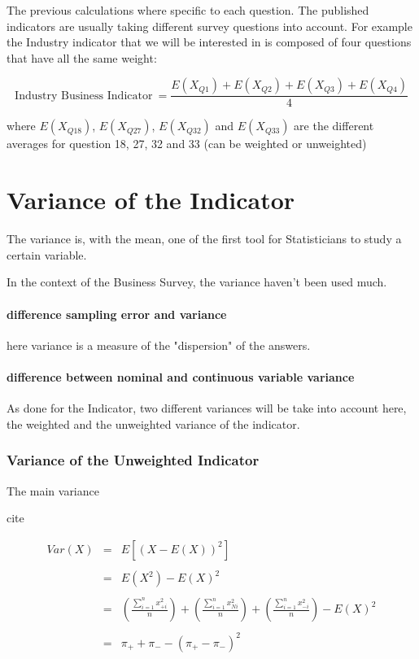 \documentclass[12pt,a4paper,oneside]{book}
\begin{document}
The previous calculations where specific to each question. The published indicators are usually taking different survey questions into account. For example the Industry indicator that we will be interested in is composed of four questions that have all the same weight:

\begin{equation}
    \mbox{Industry Business Indicator}\ = \frac{E(X_{Q1}) + E(X_{Q2}) + E(X_{Q3}) + E(X_{Q4})}{4}
\end{equation}

where 
$E(X_{Q18})$, $E(X_{Q27})$, $E(X_{Q32})$ and $E(X_{Q33})$ are the different averages for question 18, 27, 32 and 33 (can be weighted or unweighted)


\chapter{Variance of the Indicator}

The variance is, with the mean, one of the first tool for Statisticians to study a certain variable.

In the context of the Business Survey, the variance haven't been used much.

\subsubsection{difference sampling error and variance}

here variance is a measure of the "dispersion" of the answers.

\subsubsection{difference between nominal and continuous variable variance}


As done for the Indicator, two different variances will be take into account here, the weighted and the unweighted variance of the indicator.


\subsection{Variance of the Unweighted Indicator}

The main variance

cite

\begin{eqnarray}
     Var(X) &=& E \left[ \left(X-E(X) \right)^2 \right] \nonumber \\ \nonumber \\
     &=& E\left( X^2\right) - E\left( X\right)^2 \nonumber \\ \nonumber \\
     &=& \left( \frac{\sum_{i=1}^n x_{+i}^2}{n} \right) + \left( \frac{\sum_{i=1}^n x_{Ni}^2}{n} \right) + \left( \frac{\sum_{i=1}^n x_{-i}^2}{n} \right) - E(X)^2  \nonumber \\ \nonumber \\
     &=& \pi_+ + \pi_- - ( \pi_+ - \pi_- )^2 \label{var1}
\end{eqnarray}
\end{document}
